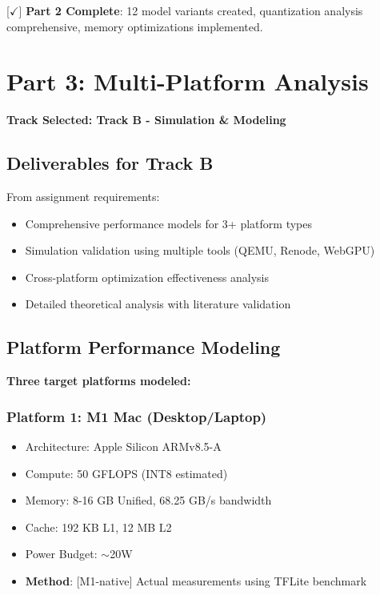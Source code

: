 \documentclass[10pt, a4paper]{article}
\begin{document}
[$\checkmark$] \textbf{Part 2 Complete}: 12 model variants created, quantization analysis comprehensive, memory optimizations implemented.

\section*{Part 3: Multi-Platform Analysis}

\textbf{Track Selected: Track B - Simulation \& Modeling}

\subsection{Deliverables for Track B}

From assignment requirements:
\begin{itemize}
    \item Comprehensive performance models for 3+ platform types
    \item Simulation validation using multiple tools (QEMU, Renode, WebGPU)
    \item Cross-platform optimization effectiveness analysis
    \item Detailed theoretical analysis with literature validation
\end{itemize}

\subsection{Platform Performance Modeling}

\textbf{Three target platforms modeled:}

\subsubsection{Platform 1: M1 Mac (Desktop/Laptop)}
\begin{itemize}
    \item Architecture: Apple Silicon ARMv8.5-A
    \item Compute: 50 GFLOPS (INT8 estimated)
    \item Memory: 8-16 GB Unified, 68.25 GB/s bandwidth
    \item Cache: 192 KB L1, 12 MB L2
    \item Power Budget: $\sim$20W
    \item \textbf{Method}: [M1-native] Actual measurements using TFLite benchmark
\end{itemize}
\end{document}
